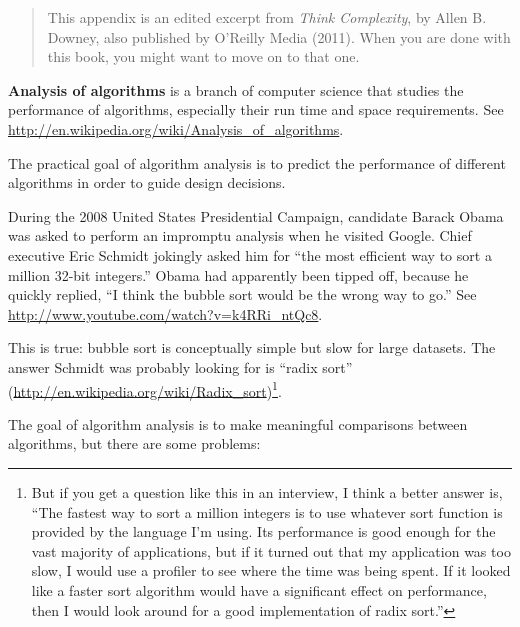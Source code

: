 \documentclass[10pt]{book}
\begin{document}
\begin{quote}
This appendix is an edited excerpt from {\it Think Complexity}, by
Allen B. Downey, also published by O'Reilly Media (2011).  When you
are done with this book, you might want to move on to that one.
\end{quote}

{\bf Analysis of algorithms} is a branch of computer science that
studies the performance of algorithms, especially their run time and
space requirements.  See
\url{http://en.wikipedia.org/wiki/Analysis_of_algorithms}.
 

The practical goal of algorithm analysis is to predict the performance
of different algorithms in order to guide design decisions.

During the 2008 United States Presidential Campaign, candidate
Barack Obama was asked to perform an impromptu analysis when
he visited Google.  Chief executive Eric Schmidt jokingly asked him
for ``the most efficient way to sort a million 32-bit integers.''
Obama had apparently been tipped off, because he quickly
replied, ``I think the bubble sort would be the wrong way to go.''
See \url{http://www.youtube.com/watch?v=k4RRi_ntQc8}.

This is true: bubble sort is conceptually simple but slow for
large datasets.  The answer Schmidt was probably looking for is
``radix sort'' (\url{http://en.wikipedia.org/wiki/Radix_sort})\footnote{
But if you get a question like this in an interview, I think
a better answer is, ``The fastest way to sort a million integers
is to use whatever sort function is provided by the language
I'm using.  Its performance is good enough for the vast majority
of applications, but if it turned out that my application was too
slow, I would use a profiler to see where the time was being
spent.  If it looked like a faster sort algorithm would have
a significant effect on performance, then I would look
around for a good implementation of radix sort.''}.

The goal of algorithm analysis is to make meaningful
comparisons between algorithms, but there are some problems:
\end{document}
